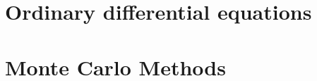 \documentclass[graybox,sectrefs,envcountresetchap,open=right,final]{svmonodo}
\begin{document}
\chapter{Ordinary differential equations}
\label{ch:ode}
\chapter{Monte Carlo Methods}
\label{ch:mc}


\clearemptydoublepage
{}
\thispagestyle{empty}





\end{document}
